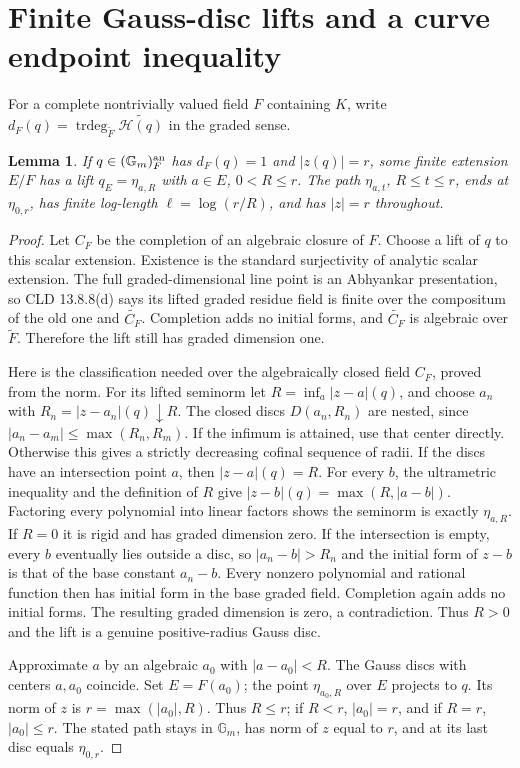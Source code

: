 \documentclass[11pt]{article}
\newcommand{\HH}{\mathscr H}
\newtheorem{lemma}[theorem]{Lemma}
\theoremstyle{remark}\newtheorem{remark}[theorem]{Remark}
\begin{document}
\section{Finite Gauss-disc lifts and a curve endpoint inequality}
For a complete nontrivially valued field $F$ containing $K$,
write $d_F(q)=\operatorname{trdeg}_{\widetilde F}
\widetilde{\HH(q)}$ in the graded sense.

\begin{lemma}\label{403disc}
If $q\in(\mathbb G_m)^{\rm an}_F$ has $d_F(q)=1$ and
$|z(q)|=r$, some finite extension $E/F$ has a lift
$q_E=\eta_{a,R}$ with $a\in E$, $0<R\le r$.
The path $\eta_{a,t}$, $R\le t\le r$, ends at
$\eta_{0,r}$, has finite log-length $\ell=\log(r/R)$,
and has $|z|=r$ throughout.
\end{lemma}
\begin{proof}
Let $C_F$ be the completion of an algebraic closure of $F$.
Choose a lift of $q$ to this scalar extension. Existence is the
standard surjectivity of analytic scalar extension. The full
graded-dimensional line point is an Abhyankar presentation, so
CLD 13.8.8(d) says its lifted graded residue field is finite over
the compositum of the old one and $\widetilde{C_F}$.
Completion adds no initial forms, and $\widetilde{C_F}$ is
algebraic over $\widetilde F$. Therefore the lift still has
graded dimension one.

Here is the classification needed over the algebraically closed
field $C_F$, proved from the norm. For its lifted seminorm let
$R=\inf_a|z-a|(q)$, and choose $a_n$ with
$R_n=|z-a_n|(q)\downarrow R$. The closed discs
$D(a_n,R_n)$ are nested, since
$|a_n-a_m|\le\max(R_n,R_m)$. If the infimum is attained,
use that center directly. Otherwise this gives a strictly
decreasing cofinal sequence of radii.
If the discs have an intersection point $a$, then
$|z-a|(q)=R$. For every $b$, the ultrametric inequality and
the definition of $R$ give
$|z-b|(q)=\max(R,|a-b|)$. Factoring every polynomial into
linear factors shows the seminorm is exactly $\eta_{a,R}$.
If $R=0$ it is rigid and has graded dimension zero.
If the intersection is empty, every $b$ eventually lies
outside a disc, so $|a_n-b|>R_n$ and the initial form of
$z-b$ is that of the base constant $a_n-b$.
Every nonzero polynomial and rational function then has initial
form in the base graded field. Completion again adds no initial
forms. The resulting graded dimension is zero, a contradiction.
Thus $R>0$ and the lift is a genuine positive-radius Gauss disc.

Approximate $a$ by an algebraic $a_0$ with $|a-a_0|<R$.
The Gauss discs with centers $a,a_0$ coincide. Set
$E=F(a_0)$; the point $\eta_{a_0,R}$ over $E$ projects to $q$.
Its norm of $z$ is $r=\max(|a_0|,R)$. Thus $R\le r$;
if $R<r$, $|a_0|=r$, and if $R=r$, $|a_0|\le r$.
The stated path stays in $\mathbb G_m$, has norm of $z$
equal to $r$, and at its last disc equals $\eta_{0,r}$.
\end{proof}
\end{document}
